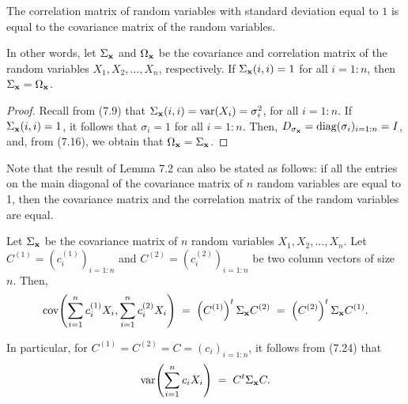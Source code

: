 \begin{lemma}
The correlation matrix of random variables with standard deviation equal to $1$ is
equal to the covariance matrix of the random variables.

In other words, let $\Sigma_{\mathbf{x}}$ and $\Omega_{\mathbf{x}}$ be the covariance and
correlation matrix of the random variables $X_1, X_2, \ldots, X_n$, respectively. If
$\Sigma_{\mathbf{x}}(i,i) = 1$ for all $i = 1:n$, then $\Sigma_{\mathbf{x}} = \Omega_{\mathbf{x}}$.
\end{lemma}

\begin{proof}
Recall from (7.9) that $\Sigma_{\mathbf{x}}(i,i) = \operatorname{var}(X_i) = \sigma_i^2$, for all $i =
1:n$. If $\Sigma_{\mathbf{x}}(i,i) = 1$, it follows that $\sigma_i = 1$ for all $i = 1:n$.
Then, $D_{\sigma_{\mathbf{x}}} = \operatorname{diag}(\sigma_i)_{i=1:n} = I$, and, from (7.16), we obtain
that $\Omega_{\mathbf{x}} = \Sigma_{\mathbf{x}}$.
\end{proof}

Note that the result of Lemma 7.2 can also be stated as follows: if all the entries
on the main diagonal of the covariance matrix of $n$ random variables are equal to
1, then the covariance matrix and the correlation matrix of the random variables are
equal.

\begin{lemma}
Let $\Sigma_{\mathbf{x}}$ be the covariance matrix of $n$ random variables $X_1, X_2,
\ldots, X_n$. Let $C^{(1)} = \left(c_i^{(1)}\right)_{i=1:n}$ and $C^{(2)} =
\left(c_i^{(2)}\right)_{i=1:n}$ be two column vectors of size $n$. Then,
\begin{equation}
\operatorname{cov}\!\left(\sum_{i=1}^n c_i^{(1)}X_i, \sum_{i=1}^n c_i^{(2)}X_i\right)
\;=\; \left(C^{(1)}\right)^t\Sigma_{\mathbf{x}}C^{(2)}
\;=\; \left(C^{(2)}\right)^t\Sigma_{\mathbf{x}}C^{(1)}.
\end{equation}

In particular, for $C^{(1)} = C^{(2)} = C = (c_i)_{i=1:n}$, it follows from (7.24)
that
\begin{equation}
\operatorname{var}\!\left(\sum_{i=1}^n c_iX_i\right) \;=\; C^t\Sigma_{\mathbf{x}}C.
\end{equation}
\end{lemma}

